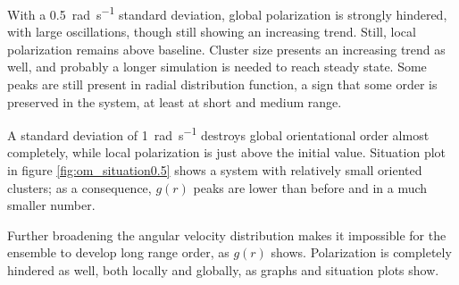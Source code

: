 \documentclass[../../master_thesis_np.tex]{subfiles}
\begin{document}
		With a \SI{0.5}{\radian\per\second} standard deviation, global polarization is strongly hindered, with large oscillations, though still showing an increasing trend.
		Still, local polarization remains above baseline.
		Cluster size presents an increasing trend as well, {\color{blue} and probably a longer simulation is needed to reach steady state}. 
		Some peaks are still present in radial distribution function, a sign that some order is preserved in the system, at least at short and medium range. 
		
		A standard deviation of \SI{1}{\radian\per\second} destroys global orientational order almost completely, while local polarization is just above the initial value.
		Situation plot in figure \ref{fig:om_situation0.5} shows a system with relatively small oriented clusters; as a consequence, $g(r)$ peaks are lower than before and in a much smaller number.
		
		Further broadening the angular velocity distribution makes it impossible for the ensemble to develop long range order, as $g(r)$ shows. 
		Polarization is completely hindered as well, both locally and globally, as graphs and situation plots show.

\end{document}
